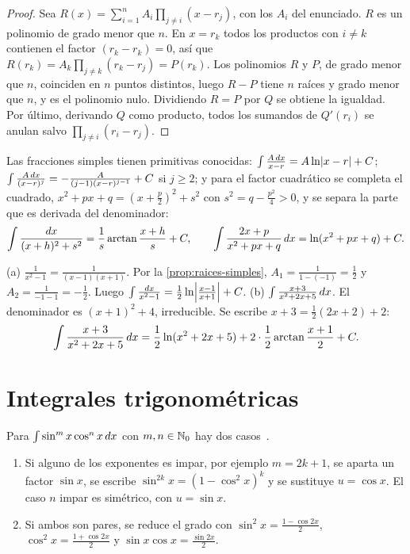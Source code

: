 \begin{proof}
Sea $R(x)=\sum_{i=1}^{n}A_i\prod_{j\neq i}(x-r_j)$, con los $A_i$ del enunciado. $R$ es un polinomio de grado menor que $n$. En $x=r_k$ todos los productos con $i\neq k$ contienen el factor $(r_k-r_k)=0$, así que $R(r_k)=A_k\prod_{j\neq k}(r_k-r_j)=P(r_k)$. Los polinomios $R$ y $P$, de grado menor que $n$, coinciden en $n$ puntos distintos, luego $R-P$ tiene $n$ raíces y grado menor que $n$, y es el polinomio nulo. Dividiendo $R=P$ por $Q$ se obtiene la igualdad. Por último, derivando $Q$ como producto, todos los sumandos de $Q'(r_i)$ se anulan salvo $\prod_{j\neq i}(r_i-r_j)$.
\end{proof}

Las fracciones simples tienen primitivas conocidas: $\int\frac{A\mathop{}\!d x}{x-r}=A\ln\lvert x-r\rvert+C$; $\int\frac{A\mathop{}\!d x}{(x-r)^{j}}=-\frac{A}{(j-1)(x-r)^{j-1}}+C$ si $j\ge2$; y para el factor cuadrático se completa el cuadrado, $x^{2}+px+q=(x+\frac p2)^{2}+s^{2}$ con $s^{2}=q-\frac{p^{2}}{4}>0$, y se separa la parte que es derivada del denominador:
\[
\int\frac{\mathop{}\!d x}{(x+h)^{2}+s^{2}}=\frac1s\arctan\frac{x+h}{s}+C,\qquad\int\frac{2x+p}{x^{2}+px+q}\mathop{}\!d x=\ln(x^{2}+px+q)+C .
\]

\begin{ejemplo}\label{ej:fracciones}
(a) $\frac{1}{x^{2}-1}=\frac{1}{(x-1)(x+1)}$. Por la \cref{prop:raices-simples}, $A_1=\frac{1}{1-(-1)}=\frac12$ y $A_2=\frac{1}{-1-1}=-\frac12$. Luego $\int\frac{\mathop{}\!d x}{x^{2}-1}=\frac12\ln\Bigl|\frac{x-1}{x+1}\Bigr|+C$.
(b) $\int\frac{x+3}{x^{2}+2x+5}\mathop{}\!d x$. El denominador es $(x+1)^{2}+4$, irreducible. Se escribe $x+3=\frac12(2x+2)+2$:
\[
\int\frac{x+3}{x^{2}+2x+5}\mathop{}\!d x=\frac12\ln(x^{2}+2x+5)+2\cdot\frac12\arctan\frac{x+1}{2}+C .
\]
\end{ejemplo}

\section{Integrales trigonométricas}

Para $\int\sin^{m}x\cos^{n}x\mathop{}\!d x$ con $m,n\in\mathbb{N}_0$ hay dos casos~\cite[§3.2]{openstax2}.
\begin{enumerate}
  \item Si alguno de los exponentes es impar, por ejemplo $m=2k+1$, se aparta un factor $\sin x$, se escribe $\sin^{2k}x=(1-\cos^{2}x)^{k}$ y se sustituye $u=\cos x$. El caso $n$ impar es simétrico, con $u=\sin x$.
  \item Si ambos son pares, se reduce el grado con $\sin^{2}x=\frac{1-\cos2x}{2}$, $\cos^{2}x=\frac{1+\cos2x}{2}$ y $\sin x\cos x=\frac{\sin2x}{2}$.
\end{enumerate}

